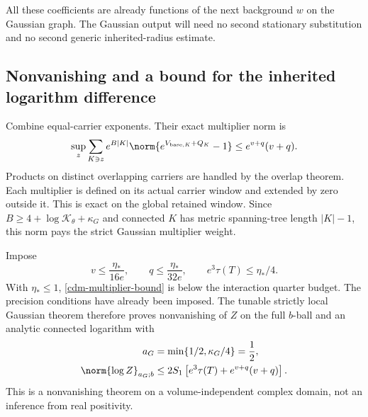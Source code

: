 All these coefficients are already functions of the next
background $w$ on the Gaussian graph. The Gaussian output
will need no second stationary substitution and no second
generic inherited-radius estimate.

\subsection{Nonvanishing and a bound for the inherited logarithm difference}
\label{cdm-nonvanishing-section}

Combine equal-carrier exponents. Their exact multiplier norm is
\begin{equation}
 \sup_z\sum_{K\ni z}e^{B|K|}
       \norm{e^{V_{\mathrm{base},K}+Q_K}-1}
       \le e^{v+q}(v+q).
 \label{cdm-multiplier-bound}
\end{equation}
Products on distinct overlapping carriers are handled by the
overlap theorem. Each multiplier is defined on its actual
carrier window and extended by zero outside it. This is exact
on the global retained window. Since
$B\ge4+\log\mathcal K_\theta+\kappa_G$ and connected $K$
has metric spanning-tree length $|K|-1$, this norm pays the
strict Gaussian multiplier weight.

Impose
\begin{equation}
 v\le\frac{\eta_*}{16e},\qquad
 q\le\frac{\eta_*}{32e},\qquad e^3\tau(T)\le\eta_*/4.
 \label{cdm-quarter-budgets}
\end{equation}
With $\eta_*\le1$, \eqref{cdm-multiplier-bound} is below the
interaction quarter budget. The precision conditions have
already been imposed. The tunable strictly local Gaussian
theorem therefore proves nonvanishing of $Z$ on the full
$b$-ball and an analytic connected logarithm with
\begin{align}
 a_G&=\min\{1/2,\kappa_G/4\}=\frac12,\notag\\
 \norm{\log Z}_{a_G;b}
 &\le2S_1\left[e^3\tau(T)+e^{v+q}(v+q)\right].
 \label{cdm-log-bound}
\end{align}
This is a nonvanishing theorem on a volume-independent
complex domain, not an inference from real positivity.

